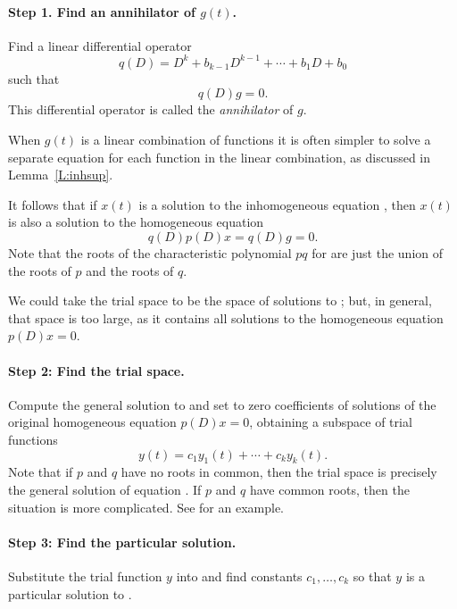 \paragraph{Step 1. Find an annihilator of $g(t)$.} 
Find a linear differential operator 
\[
q(D) = D^k + b_{k-1}D^{k-1} + \cdots + b_1D+b_0
\]
such that 
\begin{equation}  \label{eq:undetcoeffb}
q(D)g = 0.
\end{equation}
This differential operator is called the {\em annihilator\/} of $g$. 

  When $g(t)$ is a linear combination of functions
it is often simpler to solve a separate equation for each function in the 
linear combination, as discussed in Lemma~\ref{L:inhsup}.

It follows that if $x(t)$ is a solution to the 
inhomogeneous equation , then $x(t)$ is 
also a solution to the homogeneous equation 
\begin{equation}  \label{E:prodode}
q(D)p(D)x = q(D)g = 0.
\end{equation}
Note that the roots of the 
characteristic 
polynomial 
$pq$ for 
are just the union of the roots of $p$ and the roots of $q$.  

We could take the trial space to 
be the space of solutions to ;
but, in general, that space is too large, as it contains all solutions to the 
homogeneous equation $p(D)x=0$.

\paragraph{Step 2: Find the trial space.} 
Compute the general solution to  and set to zero 
coefficients of solutions of 
the original homogeneous equation $p(D)x=0$, obtaining a subspace of trial 
functions
\[
y(t)=c_1 y_1(t) + \cdots + c_k y_k(t).
\]
Note that if $p$ and $q$ have no roots in common, then the trial space is 
precisely the general solution of equation .  If $p$ 
and $q$ have common roots, then the situation is more complicated.  See 
 for an example.

\paragraph{Step 3: Find the particular solution.} 
Substitute the trial function $y$ into  and find constants 
$c_1,\ldots,c_k$ so that $y$ is a particular solution to .


